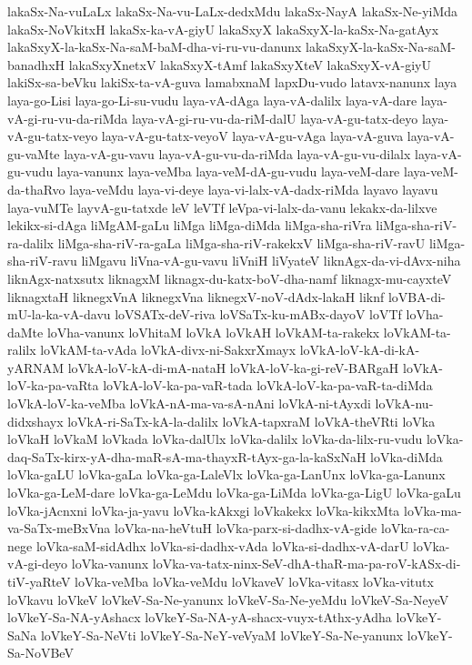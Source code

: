 {lakaSx-Na-vuLaLx
lakaSx-Na-vu-LaLx-dedxMdu
lakaSx-NayA
lakaSx-Ne-yiMda
lakaSx-NoVkitxH
lakaSx-ka-vA-giyU
lakaSxyX
lakaSxyX-la-kaSx-Na-gatAyx
lakaSxyX-la-kaSx-Na-saM-baM-dha-vi-ru-vu-danunx
lakaSxyX-la-kaSx-Na-saM-banadhxH
lakaSxyXnetxV
lakaSxyX-tAmf
lakaSxyXteV
lakaSxyX-vA-giyU
lakiSx-sa-beVku
lakiSx-ta-vA-guva
lamabxnaM
lapxDu-vudo
latavx-nanunx
laya
laya-go-Lisi
laya-go-Li-su-vudu
laya-vA-dAga
laya-vA-dalilx
laya-vA-dare
laya-vA-gi-ru-vu-da-riMda
laya-vA-gi-ru-vu-da-riM-dalU
laya-vA-gu-tatx-deyo
laya-vA-gu-tatx-veyo
laya-vA-gu-tatx-veyoV
laya-vA-gu-vAga
laya-vA-guva
laya-vA-gu-vaMte
laya-vA-gu-vavu
laya-vA-gu-vu-da-riMda
laya-vA-gu-vu-dilalx
laya-vA-gu-vudu
laya-vanunx
laya-veMba
laya-veM-dA-gu-vudu
laya-veM-dare
laya-veM-da-thaRvo
laya-veMdu
laya-vi-deye
laya-vi-lalx-vA-dadx-riMda
layavo
layavu
laya-vuMTe
layvA-gu-tatxde
leV
leVTf
leVpa-vi-lalx-da-vanu
lekakx-da-lilxve
lekikx-si-dAga
liMgAM-gaLu
liMga
liMga-diMda
liMga-sha-riVra
liMga-sha-riV-ra-dalilx
liMga-sha-riV-ra-gaLa
liMga-sha-riV-rakekxV
liMga-sha-riV-ravU
liMga-sha-riV-ravu
liMgavu
liVna-vA-gu-vavu
liVniH
liVyateV
liknAgx-da-vi-dAvx-niha
liknAgx-natxsutx
liknagxM
liknagx-du-katx-boV-dha-namf
liknagx-mu-cayxteV
liknagxtaH
liknegxVnA
liknegxVna
liknegxV-noV-dAdx-lakaH
liknf
loVBA-di-mU-la-ka-vA-davu
loVSATx-deV-riva
loVSaTx-ku-mABx-dayoV
loVTf
loVha-daMte
loVha-vanunx
loVhitaM
loVkA
loVkAH
loVkAM-ta-rakekx
loVkAM-ta-ralilx
loVkAM-ta-vAda
loVkA-divx-ni-SakxrXmayx
loVkA-loV-kA-di-kA-yARNAM
loVkA-loV-kA-di-mA-nataH
loVkA-loV-ka-gi-reV-BARgaH
loVkA-loV-ka-pa-vaRta
loVkA-loV-ka-pa-vaR-tada
loVkA-loV-ka-pa-vaR-ta-diMda
loVkA-loV-ka-veMba
loVkA-nA-ma-va-sA-nAni
loVkA-ni-tAyxdi
loVkA-nu-didxshayx
loVkA-ri-SaTx-kA-la-dalilx
loVkA-tapxraM
loVkA-theVRti
loVka
loVkaH
loVkaM
loVkada
loVka-dalUlx
loVka-dalilx
loVka-da-lilx-ru-vudu
loVka-daq-SaTx-kirx-yA-dha-maR-sA-ma-thayxR-tAyx-ga-la-kaSxNaH
loVka-diMda
loVka-gaLU
loVka-gaLa
loVka-ga-LaleVlx
loVka-ga-LanUnx
loVka-ga-Lanunx
loVka-ga-LeM-dare
loVka-ga-LeMdu
loVka-ga-LiMda
loVka-ga-LigU
loVka-gaLu
loVka-jAcnxni
loVka-ja-yavu
loVka-kAkxgi
loVkakekx
loVka-kikxMta
loVka-ma-va-SaTx-meBxVna
loVka-na-heVtuH
loVka-parx-si-dadhx-vA-gide
loVka-ra-ca-nege
loVka-saM-sidAdhx
loVka-si-dadhx-vAda
loVka-si-dadhx-vA-darU
loVka-vA-gi-deyo
loVka-vanunx
loVka-va-tatx-ninx-SeV-dhA-thaR-ma-pa-roV-kASx-di-tiV-yaRteV
loVka-veMba
loVka-veMdu
loVkaveV
loVka-vitasx
loVka-vitutx
loVkavu
loVkeV
loVkeV-Sa-Ne-yanunx
loVkeV-Sa-Ne-yeMdu
loVkeV-Sa-NeyeV
loVkeY-Sa-NA-yAshacx
loVkeY-Sa-NA-yA-shacx-vuyx-tAthx-yAdha
loVkeY-SaNa
loVkeY-Sa-NeVti
loVkeY-Sa-NeY-veVyaM
loVkeY-Sa-Ne-yanunx
loVkeY-Sa-NoVBeV
}
